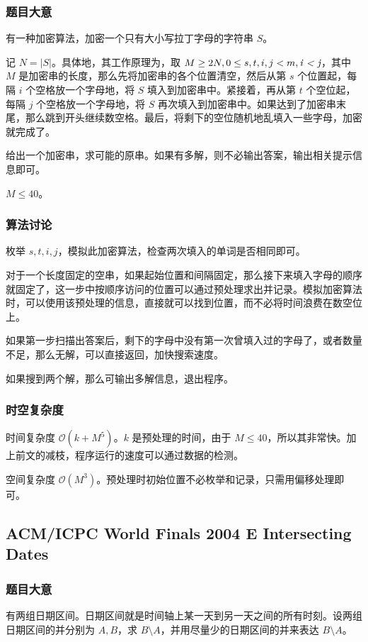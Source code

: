 			\subsubsection{题目大意}
				有一种加密算法，加密一个只有大小写拉丁字母的字符串 $S$。
				
				记 $N = |S|$。具体地，其工作原理为，取 $M \ge 2 N, 0 \le s, t, i, j < m, \emph{i < j}$，其中 $M$ 是加密串的长度，那么先将加密串的各个位置清空，然后从第 $s$ 个位置起，每隔 $i$ 个空格放一个字母地，将 $S$ 填入到加密串中。紧接着，再从第 $t$ 个空位起，每隔 $j$ 个空格放一个字母地，将 $S$ 再次填入到加密串中。如果达到了加密串末尾，那么跳到开头继续数空格。最后，将剩下的空位随机地乱填入一些字母，加密就完成了。
				
				给出一个加密串，求可能的原串。如果有多解，则不必输出答案，输出相关提示信息即可。
				
				$M \le 40$。
			\subsubsection{算法讨论}
				枚举 $s, t, i, j$，模拟此加密算法，检查两次填入的单词是否相同即可。
				
				对于一个长度固定的空串，如果起始位置和间隔固定，那么接下来填入字母的顺序就固定了，这一步中按顺序访问的位置可以通过预处理求出并记录。模拟加密算法时，可以使用该预处理的信息，直接就可以找到位置，而不必将时间浪费在数空位上。
				
				如果第一步扫描出答案后，剩下的字母中没有第一次曾填入过的字母了，或者数量不足，那么无解，可以直接返回，加快搜索速度。
				
				如果搜到两个解，那么可输出多解信息，退出程序。
			
			\subsubsection{时空复杂度}
				时间复杂度 $\mathcal{O}\left(k + M^5\right)$。$k$ 是预处理的时间，由于 $M \le 40$，所以其非常快。加上前文的减枝，程序运行的速度可以通过数据的检测。
					
				空间复杂度 $\mathcal{O}\left(M^3\right)$。预处理时初始位置不必枚举和记录，只需用偏移处理即可。
		\newpage
		\subsection{ACM/ICPC World Finals 2004 E Intersecting Dates}
			\subsubsection{题目大意}
				有两组日期区间。日期区间就是时间轴上某一天到另一天之间的所有时刻。设两组日期区间的并分别为 $A, B$，求 $B \setminus A$，并用尽量少的日期区间的并来表达 $B \setminus A$。
				
